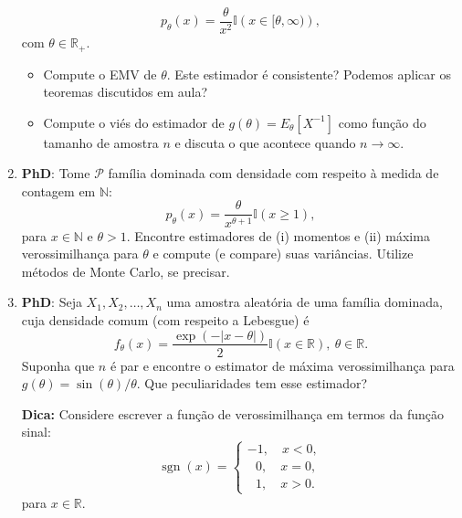 \documentclass[a4paper,10pt, notitlepage]{report}
\newcommand{\rs}{X_1, X_2, \ldots, X_n} %
\begin{document}
\begin{enumerate}
    \begin{equation*}
        p_\theta(x) = \frac{\theta}{x^2} \mathbb{I}\left(x \in [\theta, \infty)\right),
    \end{equation*}
    com $\theta \in \mathbb{R}_+$.
    \begin{itemize}
        \item Compute o EMV de $\theta$.
        Este estimador é consistente?
        Podemos aplicar os teoremas discutidos em aula?
        \item Compute o viés do estimador de $g(\theta) = E_\theta[X^{-1}]$ como função do tamanho de amostra $n$ e discuta o que acontece quando $n \to \infty$.
    \end{itemize}
    \item  \textbf{PhD}: Tome $\mathcal{P}$ família dominada com densidade com respeito à medida de contagem em $\mathbb{N}$:
    \begin{equation*}
        p_\theta(x) = \frac{\theta}{x^{\theta + 1}} \mathbb{I}(x \geq 1),
    \end{equation*}
    para $x \in \mathbb{N}$ e $\theta > 1$.
    Encontre estimadores de (i) momentos e (ii) máxima verossimilhança para $\theta$ e compute (e compare) suas variâncias.
    Utilize métodos de Monte Carlo, se precisar. 
    \item \textbf{PhD}:  Seja $\rs$ uma amostra aleatória de uma família dominada, cuja densidade comum (com respeito a Lebesgue) é  $$ f_\theta(x) = \frac{\exp(-|x-\theta|)}{2}\mathbb{I}(x \in \mathbb{R}), \: \theta \in \mathbb{R}.$$
    Suponha que $n$ é par e encontre o estimator de máxima verossimilhança para $g(\theta) = \sin(\theta)/\theta$.
    Que peculiaridades tem esse estimador?
    
    \textbf{Dica:} Considere escrever a função de verossimilhança em termos da função sinal:
    \begin{equation*}
\operatorname{sgn}(x)=
\begin{cases}
-1,\quad x < 0,\\
\:\:\:0, \quad x = 0,\\
\:\:\:1, \quad x > 0.
\end{cases}
    \end{equation*}
    para $x \in \mathbb{R}$.
\end{enumerate}



% 
% 
\end{document}
